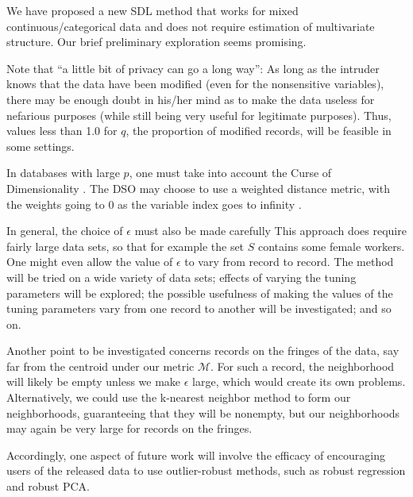 \documentclass[11pt]{article}
\begin{document}
We have proposed a new SDL method that works for mixed
continuous/categorical data and does not require estimation of
multivariate structure.  Our brief preliminary exploration seems
promising.

Note that ``a little bit of privacy can go a long way'':  As long as the
intruder knows that the data have been modified (even for the
nonsensitive variables), there may be enough doubt in his/her mind as to
make the data useless for nefarious purposes (while still being very
useful for legitimate purposes).  Thus, values less than 1.0 for $q$,
the proportion of modified records, will be feasible in some settings.

In databases with large $p$, one must take into account the Curse of
Dimensionality \cite{beyer}.  The DSO may choose to use a weighted
distance metric, with the weights going to 0 as the variable index goes
to infinity \cite{matloff2015}.

In general, the choice of $\epsilon$ must also be made carefully This
approach does require fairly large data sets, so that for example the
set $S$ contains some female workers.  One might even allow the value of
$\epsilon$ to vary from record to record.  The method will be tried on a
wide variety of data sets; effects of varying the tuning parameters will
be explored; the possible usefulness of making the values of the tuning
parameters vary from one record to another will be investigated; and so
on.

Another point to be investigated concerns records on the fringes of the
data, say far from the centroid under our metric $\mathcal{M}$.  For
such a record, the neighborhood will likely be empty unless we make
$\epsilon$ large, which would create its own problems.  Alternatively,
we could use the k-nearest neighbor method to form our neighborhoods,
guaranteeing that they will be nonempty, but our neighborhoods may again
be very large for records on the fringes.

Accordingly, one aspect of future work will involve the efficacy of
encouraging users of the released data to use outlier-robust methods,
such as robust regression and robust PCA.
\end{document}
